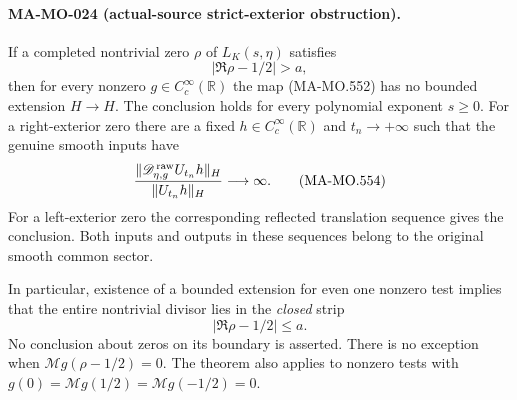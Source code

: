 \paragraph{MA-MO-024 (actual-source strict-exterior obstruction).}
If a completed nontrivial zero \(\rho\) of \(L_K(s,\eta)\)
satisfies
\[
                  |\Re\rho-1/2|>a,
 \tag{MA-MO.553}
\]
then for every nonzero \(g\in C_c^\infty(\mathbb R)\)
the map (MA-MO.552) has no bounded extension \(H\to H\).
The conclusion holds for every polynomial exponent \(s\ge0\).
For a right-exterior zero there are a fixed
\(h\in C_c^\infty(\mathbb R)\) and \(t_n\to+\infty\)
such that the genuine smooth inputs have
\[
       \frac{\|\mathscr D^{\,\rm raw}_{\eta,g}U_{t_n}h\|_H}
            {\|U_{t_n}h\|_H}\longrightarrow\infty .
 \tag{MA-MO.554}
\]
For a left-exterior zero the corresponding reflected
translation sequence gives the conclusion. Both inputs
and outputs in these sequences belong to the original
smooth common sector.

In particular, existence of a bounded extension for even
one nonzero test implies that the entire nontrivial divisor
lies in the \emph{closed} strip
\[
                   |\Re\rho-1/2|\le a .
 \tag{MA-MO.555}
\]
No conclusion about zeros on its boundary is asserted.
There is no exception when \(\mathcal Mg(\rho-1/2)=0\).
The theorem also applies to nonzero tests with
\(g(0)=\mathcal Mg(1/2)=\mathcal Mg(-1/2)=0\).

